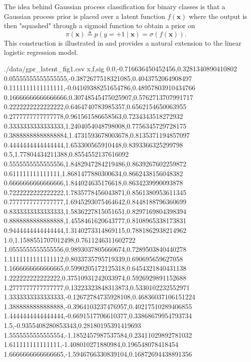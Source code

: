 The idea behind Gaussian process classification for binary classes is that a Gaussian process prior is placed over a latent function $f \left( \bm{x} \right)$ where the output is then "squashed" through a sigmoid function to obtain a prior on
\begin{equation*}
    \pi \left( \bm{x} \right) \triangleq p \left( y=+1 \mid \bm{x} \right) = \sigma \left( f \left( \bm{x} \right) \right).
\end{equation*}
This construction is illustrated in  and provides a natural extension to the linear logistic regression model.

\begin{filecontents*}{./data/gpr_latent_fig1.csv}
    x,f,sig
    0.0,-0.716636450452456,0.3281340890410802
    0.05555555555555555,-0.3872677518321085,0.4043752064908497
    0.1111111111111111,-0.04169388251654786,0.48957803910434766
    0.16666666666666666,0.30748545475025907,0.5762713707991717
    0.2222222222222222,0.6464740783985357,0.6562154650063955
    0.2777777777777778,0.961561586658563,0.7234343518272932
    0.3333333333333333,1.2404054048798008,0.7756345729728175
    0.38888888888888884,1.4731593678003678,0.8135371194857097
    0.4444444444444444,1.653300565910448,0.8393366325299798
    0.5,1.77804434211388,0.8554552137616092
    0.5555555555555556,1.8482947284219486,0.8639267602259872
    0.611111111111111,1.8681477880300634,0.8662438156048382
    0.6666666666666666,1.844024635176618,0.8634239990093878
    0.7222222222222222,1.7835778456043871,0.8561380953611345
    0.7777777777777777,1.6945293075464642,0.8448188796360699
    0.8333333333333333,1.5836227815051651,0.8297169804398394
    0.8888888888888888,1.4558461620643777,0.8108965338173831
    0.9444444444444444,1.3140273314869115,0.7881862938214962
    1.0,1.1588551707012498,0.7611246311602722
    1.0555555555555556,0.9893037805660674,0.7289503840440278
    1.1111111111111112,0.8033735795719339,0.690695659627058
    1.1666666666666665,0.5990205172125318,0.6454321840431138
    1.222222222222222,0.37510931242033974,0.5926929891152688
    1.2777777777777777,0.13223323848313873,0.5330102232552971
    1.3333333333333333,-0.12672784735928108,0.46836037106151224
    1.3888888888888888,-0.3964103237476957,0.40217510289406855
    1.4444444444444444,-0.6691517706610377,0.33868679954793734
    1.5,-0.9355408280853343,0.28180195391419693
    1.5555555555555554,-1.1852457987537584,0.23411029892781032
    1.611111111111111,-1.408010271880984,0.196548078418454
    1.6666666666666665,-1.5946766330839104,0.16872694438891356

\end{filecontents*}
